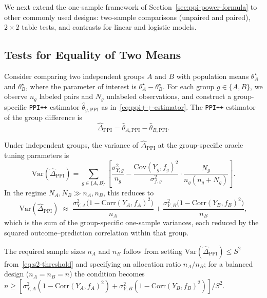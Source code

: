 \documentclass[12pt]{article}
\newcommand{\Var}{\mathrm{Var}}
\newcommand{\Cov}{\mathrm{Cov}}
\newcommand{\Corr}{\mathrm{Corr}}
\newcommand{\wh}{\widehat}
\begin{document}
We next extend the one-sample framework of Section~\ref{sec:ppi-power-formula} to
other commonly used designs: two-sample comparisons (unpaired and paired), $2\times2$ table tests, and contrasts for linear and logistic models.

\subsection{Tests for Equality of Two Means}
\label{sec:ttest}

Consider comparing two independent groups $A$ and $B$ with population means
$\theta_A^\star$ and $\theta_B^\star$, where the parameter of interest is
$\theta_A^\star - \theta_B^\star$. For each group $g \in \{A, B\}$, we observe
$n_g$ labeled pairs and $N_g$ unlabeled observations, and construct a
group-specific \texttt{PPI++} estimator $\wh{\theta}_{g,\mathrm{PPI}}$ as
in~\eqref{eq:ppi++-estimator}. The \texttt{PPI++} estimator of the group
difference is
\begin{equation}\label{eq:ppi++-ttest-est}
  \wh{\Delta}_{\mathrm{PPI}} = \wh{\theta}_{A,\mathrm{PPI}} -
  \wh{\theta}_{B,\mathrm{PPI}}.
\end{equation}

\begin{proposition}\label{prop:ttest-var}
Under independent groups, the variance of $\wh{\Delta}_{\mathrm{PPI}}$ at the
group-specific oracle tuning parameters is
\begin{equation}\label{eq:ppi++-ttest-var}
\Var(\wh{\Delta}_{\mathrm{PPI}})
= \sum_{g \in \{A,B\}}
  \left[\frac{\sigma_{Y,g}^2}{n_g}
  - \frac{\Cov(Y_g, f_g)^2}{\sigma_{f,g}^2}
    \cdot \frac{N_g}{n_g(n_g + N_g)}\right].
\end{equation}
In the regime $N_A, N_B \gg n_A, n_B$, this reduces to
\begin{equation}\label{eq:ppi++-ttest-var-approx}
\Var(\wh{\Delta}_{\mathrm{PPI}})
\;\approx\;
\frac{\sigma_{Y,A}^2\bigl(1 - \Corr(Y_A,f_A)^2\bigr)}{n_A}
+\frac{\sigma_{Y,B}^2\bigl(1 - \Corr(Y_B,f_B)^2\bigr)}{n_B},
\end{equation}
which is the sum of the group-specific one-sample variances, each reduced by
the squared outcome--prediction correlation within that group.
\end{proposition}

The required sample sizes $n_A$ and $n_B$ follow from setting
$\Var(\wh{\Delta}_{\mathrm{PPI}}) \le S^2$ from~\eqref{eq:s2-threshold} and specifying an allocation ratio
$n_A/n_B$; for a balanced design ($n_A = n_B = n$) the condition becomes $n
\ge [\sigma_{Y,A}^2(1-\Corr(Y_A,f_A)^2) +
\sigma_{Y,B}^2(1-\Corr(Y_B,f_B)^2)] / S^2$.
\end{document}
